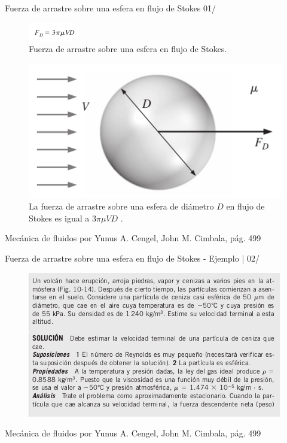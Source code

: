\begin{frame}{Fuerza de arrastre sobre una esfera en flujo de Stokes 01/}
\justifying
\begin{figure}[H]
\centering
\includegraphics[scale=0.55]{Section_Files/S3-imagenes-Jhon/0031-01.png}
\caption{Fuerza de arrastre sobre una esfera en flujo de Stokes.}
\end{figure}
\begin{figure}[H]
\centering
\includegraphics[scale=0.25]{Section_Files/S3-imagenes-Jhon/0032.png}
\caption{La fuerza de arrastre sobre una esfera de diámetro $ D $ en flujo de Stokes es igual a $3 \pi \mu V D$ .}
\end{figure}
{\tiny Mecánica de fluidos por Yunus A. Cengel, John M. Cimbala, pág. 499}
\end{frame}

\begin{frame}{Fuerza de arrastre sobre una esfera en flujo de Stokes - Ejemplo | 02/}
\justifying
\begin{figure}[H]
\centering
\includegraphics[scale=0.55]{Section_Files/S3-imagenes-Jhon/0032-01.png}
\end{figure}
{\tiny Mecánica de fluidos por Yunus A. Cengel, John M. Cimbala, pág. 499}
\end{frame}

